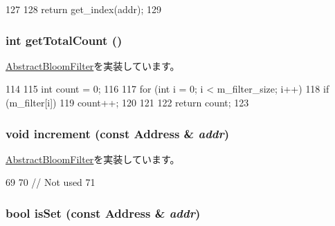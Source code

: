 \begin{DoxyCode}
127 {
128     return get_index(addr);
129 }
\end{DoxyCode}
\hypertarget{classBlockBloomFilter_a97f66183ea41a7c123bab9dd5313a74a}{
\subsubsection[{getTotalCount}]{\setlength{\rightskip}{0pt plus 5cm}int getTotalCount ()}}
\label{classBlockBloomFilter_a97f66183ea41a7c123bab9dd5313a74a}


\hyperlink{classAbstractBloomFilter_a25ea5e1ef3d4911226f37649b6efed22}{AbstractBloomFilter}を実装しています。


\begin{DoxyCode}
114 {
115     int count = 0;
116 
117     for (int i = 0; i < m_filter_size; i++) {
118         if (m_filter[i]) {
119             count++;
120         }
121     }
122     return count;
123 }
\end{DoxyCode}
\hypertarget{classBlockBloomFilter_a3e860ad851b771ac3b6eeb1716eb56bc}{
\subsubsection[{increment}]{\setlength{\rightskip}{0pt plus 5cm}void increment (const {\bf Address} \& {\em addr})}}
\label{classBlockBloomFilter_a3e860ad851b771ac3b6eeb1716eb56bc}


\hyperlink{classAbstractBloomFilter_af795f7fdeff0174e914ed1d792ffe4ff}{AbstractBloomFilter}を実装しています。


\begin{DoxyCode}
69 {
70     // Not used
71 }
\end{DoxyCode}
\hypertarget{classBlockBloomFilter_a4200ee289c3d941a4b209c4788f8087c}{
\subsubsection[{isSet}]{\setlength{\rightskip}{0pt plus 5cm}bool isSet (const {\bf Address} \& {\em addr})}}
\label{classBlockBloomFilter_a4200ee289c3d941a4b209c4788f8087c}


